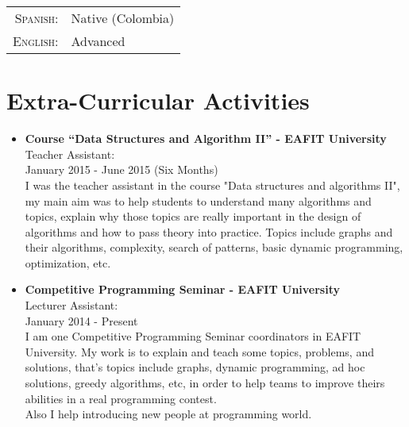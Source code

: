 \documentclass[a4paper,10pt]{article} %
\begin{document}
\begin{tabular}{rl}
\textsc{Spanish:} & Native (Colombia)\\
\textsc{English:} & Advanced \\
\end{tabular}


\section{Extra-Curricular Activities}
\begin{itemize}
\item \textbf{Course ``Data Structures and Algorithm II'' - EAFIT University}\\
Teacher Assistant:\\
January 2015 - June 2015 (Six Months)\\
I was the teacher assistant in the course "Data structures and algorithms II", my main aim was to help students to understand many algorithms and topics, explain why those topics are really important in the design of algorithms and how to pass theory into practice. Topics include graphs and their algorithms, complexity, search of patterns, basic dynamic programming, optimization, etc.\\
\item \textbf{Competitive Programming Seminar - EAFIT University}\\
Lecturer Assistant:\\
January 2014 - Present\\
I am one Competitive Programming Seminar coordinators in EAFIT University. My work is to explain and teach some topics, problems, and solutions, that's topics include graphs, dynamic programming, ad hoc solutions, greedy algorithms, etc, in order to help teams to improve theirs abilities in a real programming contest.\\
Also I help introducing new people at programming world.
\end{itemize}

\end{document}
